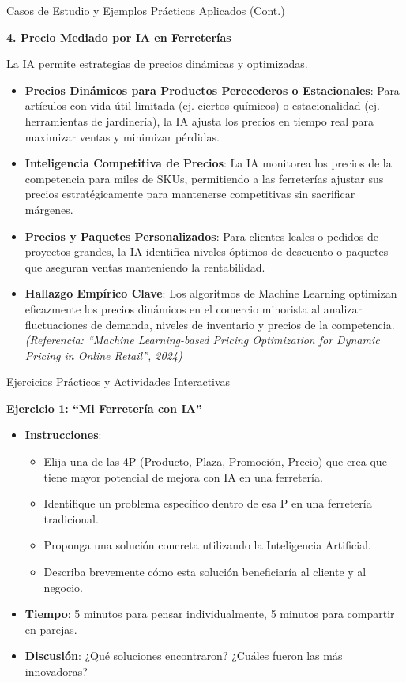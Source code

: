 \documentclass[aspectratio=169]{beamer}
\begin{document}
\begin{frame}{Casos de Estudio y Ejemplos Prácticos Aplicados (Cont.)}


\textbf{4. Precio Mediado por IA en Ferreterías}

La IA permite estrategias de precios dinámicas y optimizadas.

\begin{itemize}
  \item \textbf{Precios Dinámicos para Productos Perecederos o Estacionales}: Para artículos con vida útil limitada (ej. ciertos químicos) o estacionalidad (ej. herramientas de jardinería), la IA ajusta los precios en tiempo real para maximizar ventas y minimizar pérdidas.
  \item \textbf{Inteligencia Competitiva de Precios}: La IA monitorea los precios de la competencia para miles de SKUs, permitiendo a las ferreterías ajustar sus precios estratégicamente para mantenerse competitivas sin sacrificar márgenes.
  \item \textbf{Precios y Paquetes Personalizados}: Para clientes leales o pedidos de proyectos grandes, la IA identifica niveles óptimos de descuento o paquetes que aseguran ventas manteniendo la rentabilidad.
  \item \textbf{Hallazgo Empírico Clave}: Los algoritmos de Machine Learning optimizan eficazmente los precios dinámicos en el comercio minorista al analizar fluctuaciones de demanda, niveles de inventario y precios de la competencia. \textit{(Referencia: ``Machine Learning-based Pricing Optimization for Dynamic Pricing in Online Retail'', 2024)}
\end{itemize}
\end{frame}

\begin{frame}{Ejercicios Prácticos y Actividades Interactivas}


\textbf{Ejercicio 1: ``Mi Ferretería con IA''}

\begin{itemize}
  \item \textbf{Instrucciones}:
  \begin{itemize}
    \item Elija una de las 4P (Producto, Plaza, Promoción, Precio) que crea que tiene mayor potencial de mejora con IA en una ferretería.
    \item Identifique un problema específico dentro de esa P en una ferretería tradicional.
    \item Proponga una solución concreta utilizando la Inteligencia Artificial.
    \item Describa brevemente cómo esta solución beneficiaría al cliente y al negocio.
  \end{itemize}
  \item \textbf{Tiempo}: 5 minutos para pensar individualmente, 5 minutos para compartir en parejas.
  \item \textbf{Discusión}: ¿Qué soluciones encontraron? ¿Cuáles fueron las más innovadoras?
\end{itemize}
\end{frame}
\end{document}
